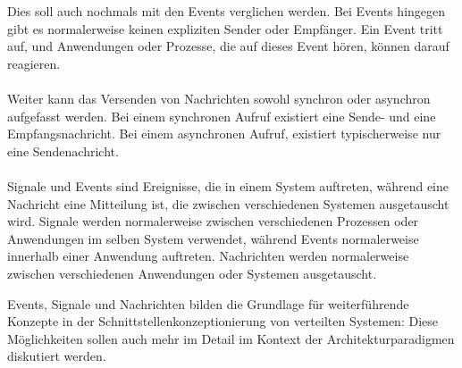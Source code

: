 \documentclass[../vs-script-first-v01.tex]{subfiles}
\begin{document}
Dies soll auch nochmals mit den Events verglichen werden. Bei Events hingegen gibt es normalerweise keinen expliziten Sender oder Empfänger. Ein Event tritt auf, und Anwendungen oder Prozesse, die auf dieses Event hören, können darauf reagieren. 
\\\\
Weiter kann das Versenden von Nachrichten sowohl synchron oder asynchron aufgefasst werden. Bei einem synchronen Aufruf existiert eine Sende- und eine Empfangsnachricht. Bei einem asynchronen Aufruf, existiert  typischerweise nur eine Sendenachricht.
\\\\
Signale und Events sind Ereignisse, die in einem System auftreten, während eine Nachricht eine Mitteilung ist, die zwischen verschiedenen Systemen ausgetauscht wird. Signale werden normalerweise zwischen verschiedenen Prozessen oder Anwendungen im selben System verwendet, während Events normalerweise innerhalb einer Anwendung auftreten. Nachrichten werden normalerweise zwischen verschiedenen Anwendungen oder Systemen ausgetauscht.

Events, Signale und Nachrichten bilden die Grundlage für weiterführende Konzepte in der Schnittstellenkonzeptionierung von verteilten Systemen:
Diese Möglichkeiten sollen auch mehr im Detail im Kontext der Architekturparadigmen diskutiert werden.
\end{document}
